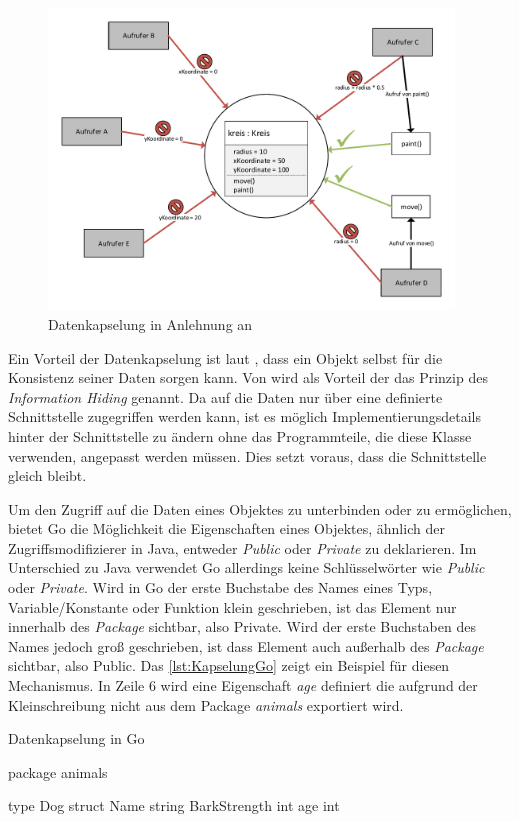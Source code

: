\begin{figure}[H]
    \centering
    \includegraphics[height=8cm]{Images/Kapselung.pdf}
    \caption{Datenkapselung in Anlehnung an \cite[]{Lahres.2011}}
    \label{fig:Kapselung}
\end{figure}

Ein Vorteil der Datenkapselung ist laut \cite[]{Lahres.2011}, dass ein Objekt selbst für die Konsistenz seiner Daten sorgen kann. 
Von \cite[S.86f]{PoetzschHeffter.2009} wird als Vorteil der das Prinzip des \emph{Information Hiding} genannt. 
Da auf die Daten nur über eine definierte Schnittstelle zugegriffen werden kann, ist es möglich Implementierungsdetails hinter der Schnittstelle zu ändern ohne das Programmteile, die diese Klasse verwenden, angepasst werden müssen. 
Dies setzt voraus, dass die Schnittstelle gleich bleibt.

Um den Zugriff auf die Daten eines Objektes zu unterbinden oder zu ermöglichen, bietet Go die Möglichkeit die Eigenschaften eines Objektes, ähnlich der Zugriffsmodifizierer in Java, entweder \emph{Public} oder \emph{Private} zu deklarieren. 
Im Unterschied zu Java verwendet Go allerdings keine Schlüsselwörter wie \emph{Public} oder \emph{Private}.
Wird in Go der erste Buchstabe des Names eines Typs, Variable/Konstante oder Funktion klein geschrieben, ist das Element nur innerhalb des \emph{Package} sichtbar, also Private. 
Wird der erste Buchstaben des Names jedoch groß geschrieben, ist dass Element auch außerhalb des \emph{Package} sichtbar, also Public.
Das \autoref{lst:KapselungGo} zeigt ein Beispiel für diesen Mechanismus. 
In Zeile 6 wird eine Eigenschaft \emph{age} definiert die aufgrund der Kleinschreibung nicht aus dem Package \emph{animals} exportiert wird. 

\begin{listing}[H]
\caption{Datenkapselung in Go \cite[]{Kennedy.GoExport}}
\label{lst:KapselungGo}
\begin{GoCode}
package animals

type Dog struct {
    Name string
    BarkStrength int
    age int
}
\end{GoCode}
\end{listing}


